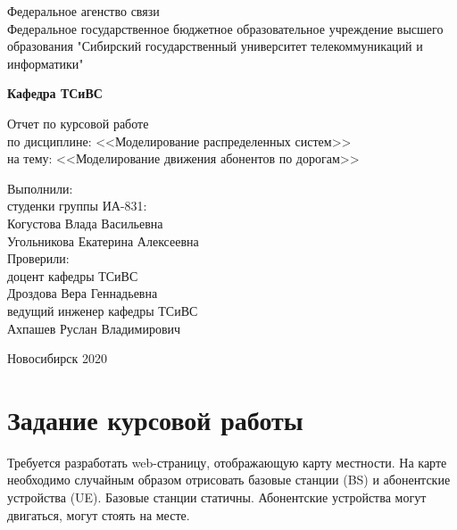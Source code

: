 \documentclass[a4paper]{article}
\begin{document}
\begin{onehalfspacing}
\begin{titlepage}
	\begin{center}
		{Федеральное агенство связи \\ Федеральное государственное бюджетное образовательное учреждение высшего образования "Сибирский государственный университет телекоммуникаций и информатики"\\[5pt]}
		\vspace{1.5cm}
		\begin{flushright}
			{\normalsize\bfseries Кафедра ТСиВС}\\
		\end{flushright}
		\vspace{2cm}
		{\Large Отчет по курсовой работе\\по дисциплине: <<Моделирование распределенных систем>>\\на тему: <<Моделирование движения абонентов по дорогам>> } \\[2cm]
		\begin{flushleft}
			{\tab Выполнили:\\\tab студенки группы ИА-831:\\\tab Когустова Влада Васильевна\\\tab Угольникова Екатерина Алексеевна} \\[1cm]
			{\tab Проверили:\\\tab доцент кафедры ТСиВС\\\tab Дроздова Вера Геннадьевна\\\tab ведущий инженер кафедры ТСиВС\\\tab Ахпашев Руслан Владимирович}
		\end{flushleft}
		\vfill
		{Новосибирск 2020}
	\end{center}
	
\end{titlepage}   


\clearpage

\tableofcontents
\clearpage
\section{Задание курсовой работы}

\tab Требуется разработать web-страницу, отображающую карту местности. На карте необходимо случайным образом отрисовать базовые станции (BS) и абонентские устройства (UE). Базовые станции статичны. Абонентские устройства могут двигаться, могут стоять на месте.


\end{onehalfspacing}
\end{document}
